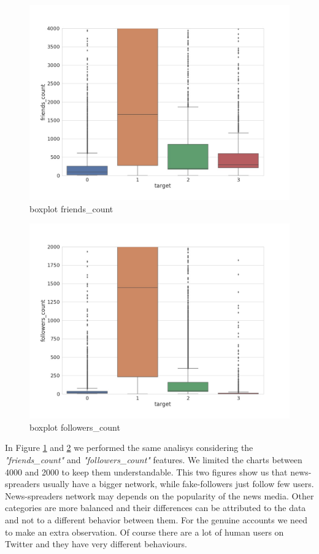 \begin{figure}
	\centering
	\includegraphics[width=\columnwidth]{chapter3/figure/boxplot_friends.jpg}
	\caption{boxplot friends\_count}
	\label{fig:box_friends}
\end{figure}

\begin{figure}
	\centering
	\includegraphics[width=\columnwidth]{chapter3/figure/boxplot_followers.jpg}
	\caption{boxplot followers\_count}
	
	\label{fig:box_followers}
\end{figure}
In Figure \ref{fig:box_friends} and \ref{fig:box_followers} we performed the same analisys considering the \emph{"friends\_count"} and \emph{"followers\_count"} features. We limited the charts between 4000 and 2000 to keep them understandable. This two figures show us that news-spreaders usually have a bigger network, while fake-followers just follow few users. News-spreaders network may depends on the popularity of the news media. Other categories are more balanced and their differences can be attributed to the data and not to a different behavior between them. For the genuine accounts we need to make an extra observation. Of course there are a lot of human users on Twitter and they have very different behaviours.